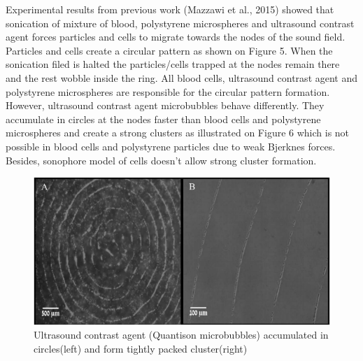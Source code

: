 Experimental results from previous work (Mazzawi et al., 2015) showed that sonication of mixture of blood, polystyrene microspheres and ultrasound contrast agent forces particles and cells  to migrate towards the nodes of the sound field. Particles and cells create a circular pattern as shown on Figure 5. When the sonication filed is halted the particles/cells trapped at the nodes remain there and the rest wobble inside the ring. All blood cells, ultrasound contrast agent and polystyrene microspheres are responsible for the circular pattern formation. However, ultrasound contrast agent microbubbles behave differently. They accumulate in circles at the nodes faster than blood cells and polystyrene microspheres and create a strong clusters as illustrated on Figure 6 which is not possible in blood cells and polystyrene particles due to weak Bjerknes forces. Besides, sonophore model of cells doesn’t allow strong cluster formation.
\begin{figure}[th]
	\centering
	\includegraphics{Figures/CircularPattern.png}
	\caption[Circular Pattern Formation of Cells]{Ultrasound contrast agent (Quantison microbubbles) accumulated in circles(left) and form tightly packed cluster(right)}
	\label{fig:Circular Pattern Formation of Particles}
\end{figure}



